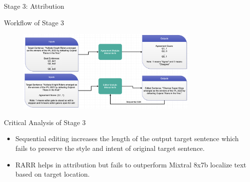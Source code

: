 \documentclass{beamer}
\begin{document}
	\begin{frame}{Stage 3: Attribution}
		\begin{block}{\scriptsize Workflow of Stage 3}\scriptsize
			\begin{figure}
				\centering
				\includegraphics[width=0.8\textwidth]{module56.png}
			\end{figure}
		\end{block}
		\begin{block}{\scriptsize Critical Analysis of Stage 3}\scriptsize
			\begin{itemize}
				\item Sequential editing increases the length of the output target sentence which fails to preserve the style and intent of original target sentence.
				\item RARR helps in attribution but fails to outperform Mixtral 8x7b localize text based on target location.
			\end{itemize}
		\end{block}
	\end{frame}
	
\end{document}
